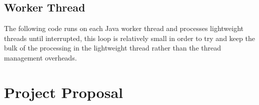 \documentclass[12pt,twoside,notitlepage]{report}
\begin{document}
\section{Worker Thread}
The following code runs on each Java worker thread and processes lightweight threads until interrupted, this loop is relatively small in order to try and keep the bulk of the processing in the lightweight thread rather than the thread
management overheads.


\chapter{Project Proposal}
\label{chap:proposal}

\end{document}

